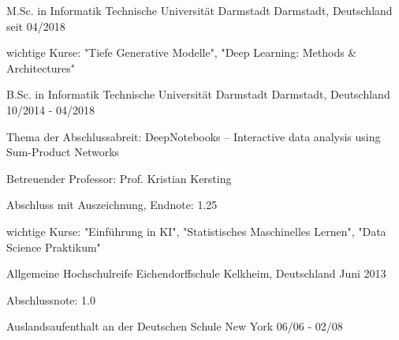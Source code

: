 

\begin{cventries}

  \cventry
    {M.Sc. in Informatik} %
    {Technische Universität Darmstadt} %
    {Darmstadt, Deutschland} %
    {seit 04/2018} %
    {
        \begin{cvitems}
        \item {wichtige Kurse: "Tiefe Generative Modelle", "Deep Learning: Methods \& Architectures"}
        \end{cvitems}
    }

  \cventry
    {B.Sc. in Informatik} %
    {Technische Universität Darmstadt} %
    {Darmstadt, Deutschland} %
    {10/2014 - 04/2018} %
    {
      \begin{cvitems} %
      \item {Thema der Abschlussabreit: DeepNotebooks -- Interactive data analysis using Sum-Product Networks}
      \item {Betreuender Professor: Prof. Kristian Kersting}
      \item {Abschluss mit Auszeichnung, Endnote: 1.25}
      \item {wichtige Kurse: "Einführung in KI", "Statistisches Maschinelles Lernen", "Data Science Praktikum" }
      \end{cvitems}
    }

  \cventry
    {Allgemeine Hochschulreife} %
    {Eichendorffschule} %
    {Kelkheim, Deutschland} %
    {Juni 2013} %
    {
      \begin{cvitems} %
        \item {Abschlussnote: 1.0}
        \item {Auslandsaufenthalt an der Deutschen Schule New York 06/06 - 02/08}
      \end{cvitems}
    }
\end{cventries}
